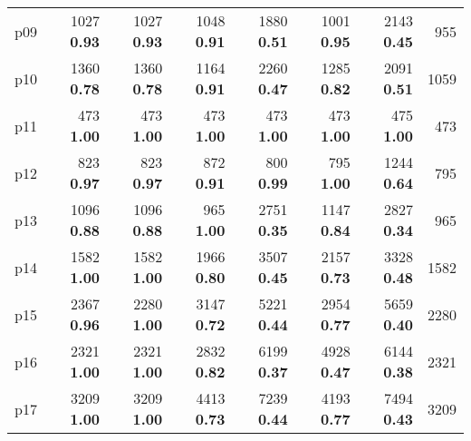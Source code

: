 \begin{tabular}{lrrrrrrr}
\multicolumn{1}{l|}{p09} & {\footnotesize 1027} \textbf{0.93} & {\footnotesize 1027} \textbf{0.93} & {\footnotesize 1048} \textbf{0.91} & {\footnotesize 1880} \textbf{0.51} & {\footnotesize 1001} \textbf{0.95} & {\footnotesize 2143} \textbf{0.45} & \multicolumn{1}{|r}{955}\\
\multicolumn{1}{l|}{p10} & {\footnotesize 1360} \textbf{0.78} & {\footnotesize 1360} \textbf{0.78} & {\footnotesize 1164} \textbf{0.91} & {\footnotesize 2260} \textbf{0.47} & {\footnotesize 1285} \textbf{0.82} & {\footnotesize 2091} \textbf{0.51} & \multicolumn{1}{|r}{1059}\\
\multicolumn{1}{l|}{p11} & {\footnotesize 473} \textbf{1.00} & {\footnotesize 473} \textbf{1.00} & {\footnotesize 473} \textbf{1.00} & {\footnotesize 473} \textbf{1.00} & {\footnotesize 473} \textbf{1.00} & {\footnotesize 475} \textbf{1.00} & \multicolumn{1}{|r}{473}\\
\multicolumn{1}{l|}{p12} & {\footnotesize 823} \textbf{0.97} & {\footnotesize 823} \textbf{0.97} & {\footnotesize 872} \textbf{0.91} & {\footnotesize 800} \textbf{0.99} & {\footnotesize 795} \textbf{1.00} & {\footnotesize 1244} \textbf{0.64} & \multicolumn{1}{|r}{795}\\
\multicolumn{1}{l|}{p13} & {\footnotesize 1096} \textbf{0.88} & {\footnotesize 1096} \textbf{0.88} & {\footnotesize 965} \textbf{1.00} & {\footnotesize 2751} \textbf{0.35} & {\footnotesize 1147} \textbf{0.84} & {\footnotesize 2827} \textbf{0.34} & \multicolumn{1}{|r}{965}\\
\multicolumn{1}{l|}{p14} & {\footnotesize 1582} \textbf{1.00} & {\footnotesize 1582} \textbf{1.00} & {\footnotesize 1966} \textbf{0.80} & {\footnotesize 3507} \textbf{0.45} & {\footnotesize 2157} \textbf{0.73} & {\footnotesize 3328} \textbf{0.48} & \multicolumn{1}{|r}{1582}\\
\multicolumn{1}{l|}{p15} & {\footnotesize 2367} \textbf{0.96} & {\footnotesize 2280} \textbf{1.00} & {\footnotesize 3147} \textbf{0.72} & {\footnotesize 5221} \textbf{0.44} & {\footnotesize 2954} \textbf{0.77} & {\footnotesize 5659} \textbf{0.40} & \multicolumn{1}{|r}{2280}\\
\multicolumn{1}{l|}{p16} & {\footnotesize 2321} \textbf{1.00} & {\footnotesize 2321} \textbf{1.00} & {\footnotesize 2832} \textbf{0.82} & {\footnotesize 6199} \textbf{0.37} & {\footnotesize 4928} \textbf{0.47} & {\footnotesize 6144} \textbf{0.38} & \multicolumn{1}{|r}{2321}\\
\multicolumn{1}{l|}{p17} & {\footnotesize 3209} \textbf{1.00} & {\footnotesize 3209} \textbf{1.00} & {\footnotesize 4413} \textbf{0.73} & {\footnotesize 7239} \textbf{0.44} & {\footnotesize 4193} \textbf{0.77} & {\footnotesize 7494} \textbf{0.43} & \multicolumn{1}{|r}{3209}\\

\end{tabular}
